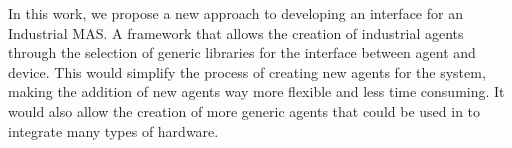 In this work, we propose a new approach to developing an interface for an Industrial MAS. A framework that allows the creation of industrial agents through the selection of generic libraries for the interface between agent and device. This would simplify the process of creating new agents for the system, making the addition of new agents way more flexible and less time consuming. It would also allow the creation of more generic agents that could be used in to integrate many types of hardware.